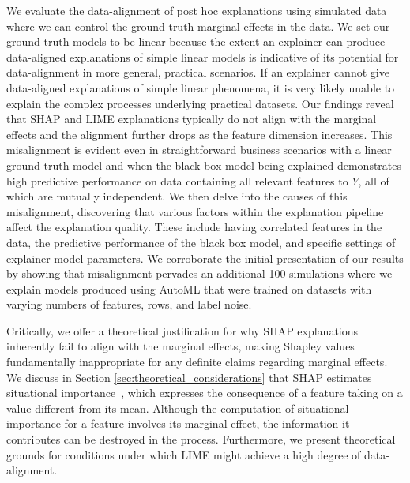 \documentclass[12pt]{article}  %
\begin{document}
We evaluate the data-alignment of post hoc explanations using simulated data where we can control the ground truth marginal effects in the data. We set our ground truth models to be linear because the extent an explainer can produce data-aligned explanations of simple linear models is  indicative of its potential for data-alignment in more general, practical scenarios. If an explainer cannot give data-aligned explanations of simple linear phenomena, it is very likely unable to explain the complex processes underlying practical datasets. Our findings reveal that SHAP and LIME explanations typically do not align with the marginal effects and the alignment further drops as the feature dimension increases. This misalignment is evident even in straightforward business scenarios with a linear ground truth model and when the black box model being explained demonstrates high predictive performance on data containing all relevant features to $Y$, all of which are mutually independent. We then delve into the causes of this misalignment, discovering that various factors within the explanation pipeline affect the explanation quality. These include having correlated features in the data, the predictive performance of the black box model, and specific settings of explainer model parameters. We corroborate the initial presentation of our results by showing that misalignment pervades an additional 100 simulations where we explain models produced using AutoML that were trained on datasets with varying numbers of features, rows, and label noise.


Critically, we offer a theoretical justification for why SHAP explanations inherently fail to align with the marginal effects, making Shapley values fundamentally inappropriate for any definite claims regarding marginal effects. We discuss in Section \ref{sec:theoretical_considerations} that SHAP estimates situational importance~\citep{StrumbeljErik2014Epma}, 
 which expresses the consequence of a feature taking on a value different from its mean. Although the computation of situational importance for a feature involves its marginal effect, the information it contributes can be destroyed in the process. Furthermore, we present theoretical grounds for conditions under which LIME might achieve a high degree of data-alignment.


\end{document}
